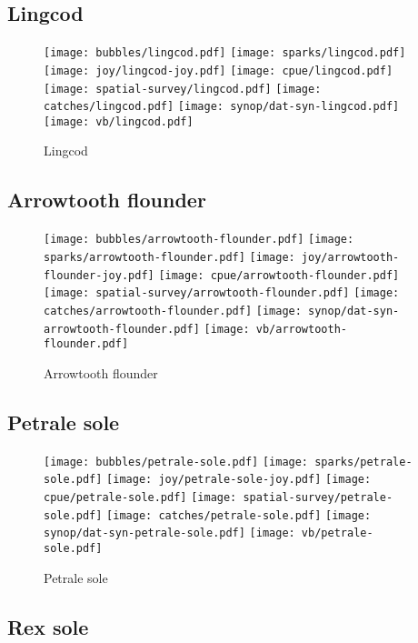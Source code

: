 \subsection*{Lingcod}

\begin{figure}[htbp]
\centering
\texttt{[image: bubbles/lingcod.pdf]}
\texttt{[image: sparks/lingcod.pdf]}
\texttt{[image: joy/lingcod-joy.pdf]}
\texttt{[image: cpue/lingcod.pdf]}
\texttt{[image: spatial-survey/lingcod.pdf]}
\texttt{[image: catches/lingcod.pdf]}
\texttt{[image: synop/dat-syn-lingcod.pdf]}
\texttt{[image: vb/lingcod.pdf]}
\caption{Lingcod}
\end{figure}
\clearpage
\subsection*{Arrowtooth flounder}

\begin{figure}[htbp]
\centering
\texttt{[image: bubbles/arrowtooth-flounder.pdf]}
\texttt{[image: sparks/arrowtooth-flounder.pdf]}
\texttt{[image: joy/arrowtooth-flounder-joy.pdf]}
\texttt{[image: cpue/arrowtooth-flounder.pdf]}
\texttt{[image: spatial-survey/arrowtooth-flounder.pdf]}
\texttt{[image: catches/arrowtooth-flounder.pdf]}
\texttt{[image: synop/dat-syn-arrowtooth-flounder.pdf]}
\texttt{[image: vb/arrowtooth-flounder.pdf]}
\caption{Arrowtooth flounder}
\end{figure}
\clearpage
\subsection*{Petrale sole}

\begin{figure}[htbp]
\centering
\texttt{[image: bubbles/petrale-sole.pdf]}
\texttt{[image: sparks/petrale-sole.pdf]}
\texttt{[image: joy/petrale-sole-joy.pdf]}
\texttt{[image: cpue/petrale-sole.pdf]}
\texttt{[image: spatial-survey/petrale-sole.pdf]}
\texttt{[image: catches/petrale-sole.pdf]}
\texttt{[image: synop/dat-syn-petrale-sole.pdf]}
\texttt{[image: vb/petrale-sole.pdf]}
\caption{Petrale sole}
\end{figure}
\clearpage
\subsection*{Rex sole}

